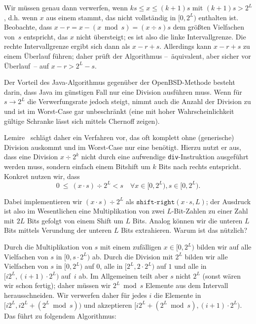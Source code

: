 Wir müssen genau dann verwerfen, wenn $ks \le x \le (k+1)s$ mit $(k+1)s > 2^L$, d.h. wenn $x$ aus einem  stammt, das nicht vollständig in $[0, 2^L)$ enthalten ist.
Beobachte, dass $x - r = x - (x \bmod s) = (x \div s)s$ dem größten Vielfachen von~$s$ entspricht, das $x$ nicht übersteigt;
es ist also die linke Intervallgrenze.
Die rechte Intervallgrenze ergibt sich dann als $x- r +s$.
Allerdings kann $x - r + s$ zu einem Überlauf führen; daher prüft der Algorithmus --~äquivalent, aber sicher vor Überlauf~-- auf $x - r > 2^L - s$.

Der Vorteil des Java-Algorithmus gegenüber der OpenBSD-Methode besteht darin, dass Java im günstigen Fall nur eine Division ausführen muss.
Wenn für $s \to 2^L$ die Verwerfungsrate jedoch steigt, nimmt auch die Anzahl der Division zu und ist im Worst-Case gar unbeschränkt (eine mit hoher Wahrscheinlichkeit gültige Schranke lässt sich mittels Chernoff zeigen).

Lemire~\cite{DBLP:journals/tomacs/Lemire19} schlägt daher ein Verfahren vor, das oft komplett ohne (generische) Division auskommt und im Worst-Case nur eine benötigt.
Hierzu nutzt er aus, dass eine Division $x \div 2^k$ nicht durch eine aufwendige \texttt{div}-Instruktion ausgeführt werden muss, sondern einfach einem Bitshift um $k$ Bits nach rechts entspricht.
Konkret nutzen wir, dass
\begin{equation}
    0 \ \le \ (x \cdot s) \div 2^L  <  s
    \quad \forall x \in [0, 2^L), s \in [0, 2^L).
\end{equation}

Dabei implementieren wir $(x \cdot s) \div 2^L$ als $\texttt{shift-right}(x \cdot s, L)$;
der Ausdruck ist also im Wesentlichen eine Multiplikation von zwei $L$-Bit-Zahlen zu einer Zahl mit $2L$ Bits gefolgt von einem Shift um $L$ Bits.
Analog können wir die unteren $L$ Bits mittels Verundung der unteren $L$ Bits extrahieren.
Warum ist das nützlich?

Durch die Multiplikation von $s$ mit einem zufälligen $x \in [0, 2^L)$ bilden wir auf alle Vielfachen von $s$ in $[0, s\cdot 2^L)$ ab.
Durch die Division mit $2^L$ bilden wir alle Vielfachen von $s$ in $[0, 2^L)$ auf $0$, alle in $[2^L, 2\cdot2^L)$ auf $1$ und alle in $[i 2^L, (i+1)\cdot2^L)$ auf~$i$ ab.
Im Allgemeinen teilt aber $s$ nicht $2^L$ (sonst wären wir schon fertig);
daher müssen wir $2^L \bmod s$ Elemente aus dem Intervall herausschneiden.
Wir verwerfen daher für jedes $i$ die Elemente in $[i 2^L, i 2^L + (2^L \bmod s))$ und akzeptieren $[ i 2^L + (2^L \bmod s), (i+1)\cdot2^L)$.
Das führt zu folgendem Algorithmus:

